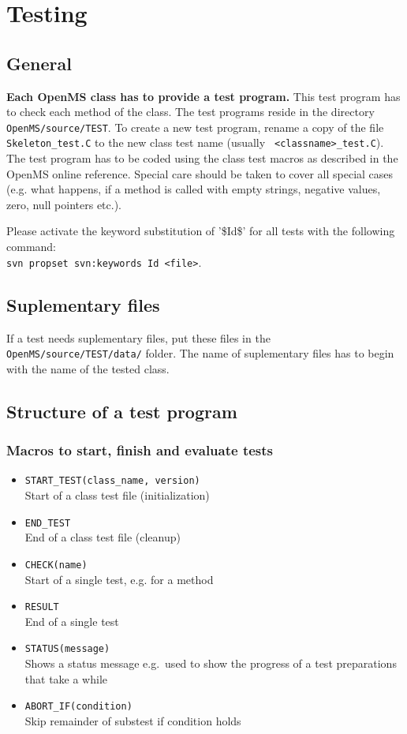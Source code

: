 \documentclass[a4]{article}
\begin{document}
\section{Testing} 

\subsection{General}

{\bf Each OpenMS class has to provide a test program.} This test program has to check
each method of the class. The test programs reside in the directory
{\tt OpenMS/source/TEST}. To create a new test program, rename a copy of the file
{\tt Skeleton\_test.C} to the new class test name (usually {\tt
<classname>\_test.C}). The test program has to be coded using the class test
macros as described in the OpenMS online reference. Special care should be taken
to cover all special cases (e.g. what happens, if a method is called with
empty strings, negative values, zero, null pointers etc.).

Please activate the keyword substitution of '\$Id\$' for all tests with the following command:\\
{\tt svn propset svn:keywords Id <file>}.

\subsection{Suplementary files}
If a test needs suplementary files, put these files in the {\tt OpenMS/source/TEST/data/} folder.
The name of suplementary files has to begin with the name of the tested class.

\subsection{Structure of a test program}

\subsubsection{Macros to start, finish and evaluate tests}
\begin{itemize}
        \item {\tt START\_TEST(class\_name, version)} \\ Start of a class test file (initialization)
        \item {\tt END\_TEST} \\ End of a class test file (cleanup)
        \item {\tt CHECK(name)} \\ Start of a single test, e.g. for a method
        \item {\tt RESULT} \\ End of a single test
        \item {\tt STATUS(message)} \\ Shows a status message e.g.\ used to show the progress of a test preparations that take a while
        \item {\tt ABORT\_IF(condition)} \\ Skip remainder of substest if condition holds
\end{itemize}
\end{document}
